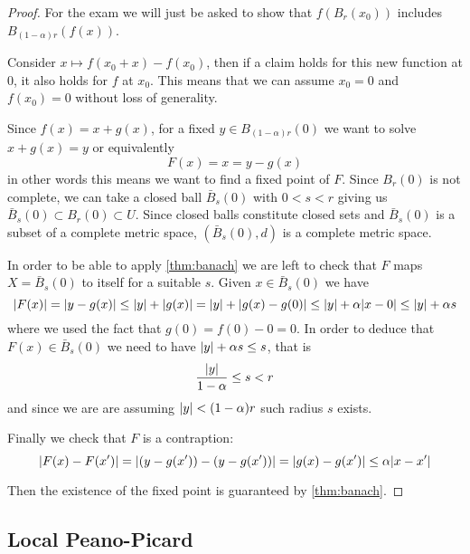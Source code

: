 \documentclass[12pt]{extarticle}
\numberwithin{equation}{section}
\begin{document}
\begin{proof}
    For the exam we will just be asked to show that $f(B_r(x_0))$ includes $B_{(1-\alpha)r}(f(x))$.

    Consider $x \mapsto f(x_0 + x) - f(x_0)$, then if a claim holds for this new function at $0$, it also holds for $f$ at $x_0$.
    This means that we can assume $x_0 = 0$ and $f(x_0) =0$ without loss of generality.

    Since $f(x) = x + g(x)$, for a fixed $y \in B_{(1-\alpha)r}(0)$ we want to solve $x + g(x) = y$ or equivalently
    \begin{equation}
        F(x) = x = y-g(x)
    \end{equation}
    in other words this means we want to find a fixed point of $F$.
    Since $B_r(0)$ is not complete, we can take a closed ball $\bar B_s(0)$ with $0 < s< r$ giving us
    $\bar B_s(0) \subset B_r(0) \subset U$.
    Since closed balls constitute closed sets and $\bar B_s(0)$ is a subset of a complete metric space,
    $(\bar B_s(0), d)$ is a complete metric space.

    In order to be able to apply \cref{thm:banach} we are left to check that $F$ maps $X = \bar B_s(0)$ to itself
    for a suitable $s$.
    Given $x \in \bar B_s(0)$ we have
    \begin{equation}
        \abs{F(x)} = \abs{y - g(x)} \leq \abs{y} + \abs{g(x)} =  \abs{y} + \abs{g(x) - g(0)} \leq \abs{y} + \alpha \abs{x - 0} \leq \abs{y} + \alpha s
    \end{equation}
    where we used the fact that $g(0) = f(0) - 0 = 0$.
    In order to deduce that $F(x) \in \bar B_s (0)$ we need to have $\abs{y} + \alpha s \leq s$, that is
    \begin{equation}
        \frac{\abs{y}}{1-\alpha} \leq s < r
    \end{equation}
    and since we are are assuming $\abs{y} < (1-\alpha) r$ such radius $s$ exists.

    Finally we check that $F$ is a contraption:
    \begin{equation}
        \abs{F(x) - F(x')} = \abs{(y-g(x')) - (y-g(x'))} = \abs{g(x)-g(x')} \leq \alpha \abs{x-x'}
    \end{equation}

    Then the existence of the fixed point is guaranteed by \cref{thm:banach}.
\end{proof}

\subsection{Local Peano-Picard}
\end{document}
